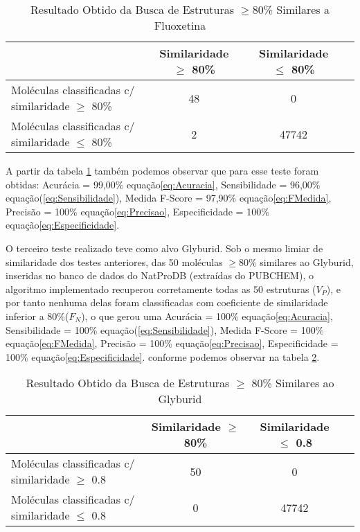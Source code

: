  \begin{table}[!htb]
	\centering
	\footnotesize
	\caption[Resultado Obtido da Busca de Estruturas $\geq$80\% Similares a Fluoxetina]{Resultado Obtido da Busca de Estruturas $\geq$80\% Similares a Fluoxetina}
	\label{tab:Fluoxetina}	
	\begin{tabular}{p{4cm}ccc}
		\hline \SPACE
		\textbf{}&\textbf{Similaridade $\geq $ 80\%} & \textbf{Similaridade $\leq $ 80\%} \\ \hline \SPACE
	Moléculas classificadas c/ similaridade $\geq $ 80\%  &	48 & 0 \\ \hline \SPACE
	Moléculas classificadas c/ similaridade $\leq $ 80\%  & 2 & 47742\\ \hline 
	\end{tabular}
\end{table}       
A partir da tabela \ref{tab:Fluoxetina} também podemos observar que para esse teste foram obtidas: Acurácia = 99,00\% equação\eqref{eq:Acuracia}, Sensibilidade = 96,00\% equação(\ref{eq:Sensibilidade}), Medida F-Score = 97,90\% equação\eqref{eq:FMedida}, Precisão = 100\% equação\eqref{eq:Precisao},  Especificidade = 100\% equação\eqref{eq:Especificidade}.

O terceiro teste realizado teve como alvo Glyburid. Sob o mesmo limiar de similaridade dos testes anteriores, das 50 moléculas $\geq $80\% similares ao Glyburid, inseridas no banco de dados do NatProDB (extraídas do PUBCHEM), o algoritmo implementado  recuperou corretamente todas as 50 estruturas ($V_P$), e por tanto nenhuma delas foram classificadas com coeficiente de similaridade inferior a 80\%($F_N$), o que gerou uma  Acurácia = 100\%  equação\eqref{eq:Acuracia}, Sensibilidade = 100\% equação(\ref{eq:Sensibilidade}), Medida F-Score = 100\% equação\eqref{eq:FMedida}, Precisão = 100\% equação\eqref{eq:Precisao},  Especificidade = 100\% equação\eqref{eq:Especificidade}. conforme podemos observar na tabela \ref{tab:Glyburid}.

 \begin{table}[!htb]
	\centering
	\footnotesize
	\caption[Resultado Obtido da Busca de Estruturas $\geq$ 80\% Similares ao Glyburid]{Resultado Obtido da Busca de Estruturas $\geq$ 80\% Similares ao Glyburid}
	\label{tab:Glyburid}	
	\begin{tabular}{p{4cm}ccc}
		\hline \SPACE
		\textbf{}&\textbf{Similaridade $\geq $ 80\%} & \textbf{Similaridade $\leq $ 0.8} \\ \hline \SPACE
	Moléculas classificadas c/ similaridade $\geq $ 0.8  &	50 & 0 \\ \hline \SPACE
	Moléculas classificadas c/ similaridade $\leq $ 0.8  & 0 & 47742\\ \hline 
	\end{tabular}
\end{table} 

